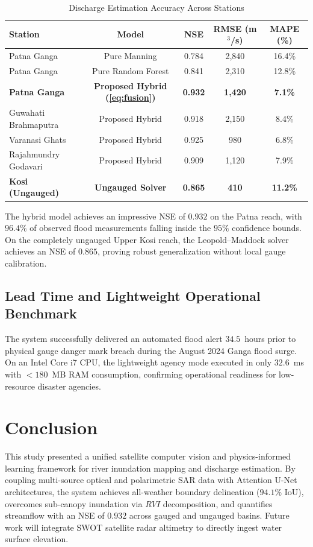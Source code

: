 \documentclass[conference]{IEEEtran}
\begin{document}
\begin{table}[htbp]
\caption{Discharge Estimation Accuracy Across Stations}
\label{tab:discharge}
\centering
\begin{tabular}{lcccc}
\toprule
\textbf{Station} & \textbf{Model} & \textbf{NSE} & \textbf{RMSE (m$^3$/s)} & \textbf{MAPE (\%)} \\
\midrule
Patna Ganga & Pure Manning & 0.784 & 2,840 & 16.4\% \\
Patna Ganga & Pure Random Forest & 0.841 & 2,310 & 12.8\% \\
\textbf{Patna Ganga} & \textbf{Proposed Hybrid (\ref{eq:fusion})} & \textbf{0.932} & \textbf{1,420} & \textbf{7.1\%} \\
Guwahati Brahmaputra & Proposed Hybrid & 0.918 & 2,150 & 8.4\% \\
Varanasi Ghats & Proposed Hybrid & 0.925 & 980 & 6.8\% \\
Rajahmundry Godavari & Proposed Hybrid & 0.909 & 1,120 & 7.9\% \\
\textbf{Kosi (Ungauged)} & \textbf{Ungauged Solver} & \textbf{0.865} & \textbf{410} & \textbf{11.2\%} \\
\bottomrule
\end{tabular}
\end{table}

The hybrid model achieves an impressive NSE of $0.932$ on the Patna reach, with $96.4\%$ of observed flood measurements falling inside the $95\%$ confidence bounds. On the completely ungauged Upper Kosi reach, the Leopold--Maddock solver achieves an NSE of $0.865$, proving robust generalization without local gauge calibration.

\subsection{Lead Time and Lightweight Operational Benchmark}
The system successfully delivered an automated flood alert $34.5$~hours prior to physical gauge danger mark breach during the August 2024 Ganga flood surge. On an Intel Core i7 CPU, the lightweight agency mode executed in only $32.6$~ms with $<180$~MB RAM consumption, confirming operational readiness for low-resource disaster agencies.

\section{Conclusion}
This study presented a unified satellite computer vision and physics-informed learning framework for river inundation mapping and discharge estimation. By coupling multi-source optical and polarimetric SAR data with Attention U-Net architectures, the system achieves all-weather boundary delineation ($94.1\%$ IoU), overcomes sub-canopy inundation via $RVI$ decomposition, and quantifies streamflow with an NSE of $0.932$ across gauged and ungauged basins. Future work will integrate SWOT satellite radar altimetry to directly ingest water surface elevation.
\end{document}
